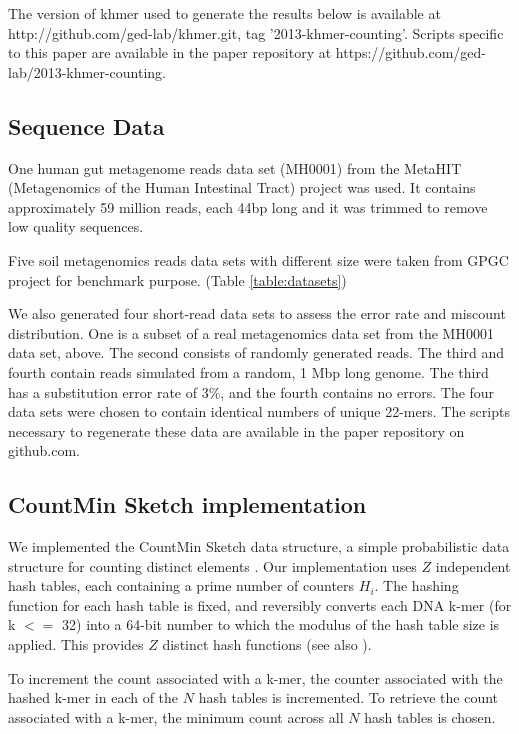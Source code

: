 \documentclass{article}
\begin{document}

The version of khmer used to generate the results below is available
at http://github.com/ged-lab/khmer.git, tag '2013-khmer-counting'.
Scripts specific to this paper are available in the paper repository
at https://github.com/ged-lab/2013-khmer-counting.

\subsection{Sequence Data}

One human gut metagenome reads data set (MH0001) from the 
MetaHIT (Metagenomics of the Human Intestinal Tract) project\cite{Qin2010} was used. 
It contains approximately 59 million reads, each 44bp long and it was trimmed to remove low quality sequences. 

Five soil metagenomics reads data sets with different size were taken
from GPGC project for benchmark purpose.
(Table \ref{table:datasets})

We also generated four short-read data sets to assess the error
rate and miscount distribution. One is a subset of a real
metagenomics data set from the MH0001 data set, above. The second
consists of randomly generated reads. The third and fourth contain
reads simulated from a random, 1 Mbp long genome.  The third has a
substitution error rate of 3\%, and the fourth contains no errors. The
four data sets were chosen to contain identical numbers of unique
22-mers.  The scripts necessary to regenerate these data are available
in the paper repository on github.com.


\subsection{CountMin Sketch implementation}

We implemented the CountMin Sketch data structure, a simple
probabilistic data structure for counting distinct elements
\cite{Cormode2005}.  Our implementation uses $Z$ independent hash
tables, each containing a prime number of counters $H_i$.  The hashing
function for each hash table is fixed, and reversibly converts each
DNA k-mer (for k $<=$ 32) into a 64-bit number to which the modulus of
the hash table size is applied.  This provides $Z$ distinct hash
functions (see also \cite{adina2013}).

To increment the count associated with a k-mer, the counter associated
with the hashed k-mer in each of the $N$ hash tables is incremented.
To retrieve the count associated with a k-mer, the minimum count
across all $N$ hash tables is chosen.
\end{document}
